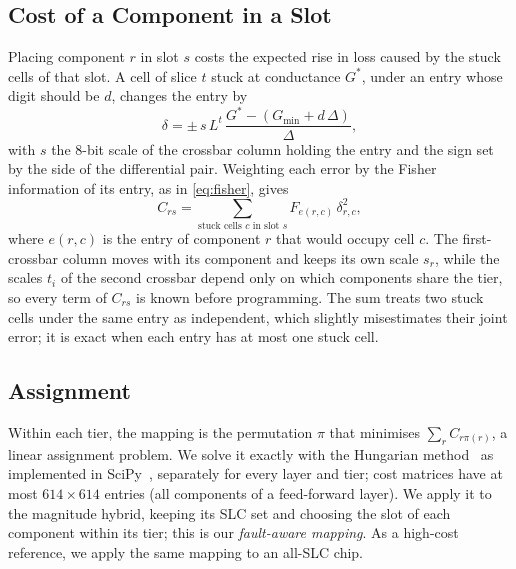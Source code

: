 \subsection{Cost of a Component in a Slot}
Placing component $r$ in slot $s$ costs the expected rise in loss caused by the stuck cells of that slot.
A cell of slice $t$ stuck at conductance $G^{*}$, under an entry whose digit should be $d$, changes the
entry by
\begin{equation}
\delta=\pm\,s\,L^{t}\,\frac{G^{*}-(G_{\min}+d\,\Delta)}{\Delta},
\label{eq:stuckerr}
\end{equation}
with $s$ the 8-bit scale of the crossbar column holding the entry and the sign set by the side of the
differential pair. Weighting each error by the Fisher information of its entry, as in \cref{eq:fisher},
gives
\begin{equation}
C_{rs}=\sum_{\text{stuck cells }c\text{ in slot }s}F_{e(r,c)}\,\delta_{r,c}^{2},
\label{eq:cost}
\end{equation}
where $e(r,c)$ is the entry of component $r$ that would occupy cell $c$. The first-crossbar column moves with
its component and keeps its own scale $s_r$, while the scales $t_i$ of the second crossbar depend only on
which components share the tier, so every term of $C_{rs}$ is known before programming. The sum treats two
stuck cells under the same entry as independent, which slightly misestimates their joint error; it is
exact when each entry has at most one stuck cell.

\subsection{Assignment}
Within each tier, the mapping is the permutation $\pi$ that minimises $\sum_r C_{r\pi(r)}$, a linear
assignment problem. We solve it exactly with the Hungarian method~\cite{kuhn1955hungarian} as implemented
in SciPy~\cite{virtanen2020scipy}, separately for every layer and tier; cost matrices have at most
$614\times614$ entries (all components of a feed-forward layer). We apply it to the
magnitude hybrid, keeping its SLC set and choosing the slot of each component within its tier; this is
our \emph{fault-aware mapping}. As a high-cost reference, we apply the same mapping to an all-SLC chip.

